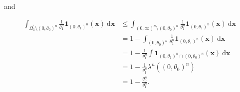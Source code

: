 \begin{solution}
\begin{enumerate}[label = (\alph*)]
    and

    \begin{align*}
        \int_{\Omega_1^\prime \setminus (0, \theta_0)^n}
            \frac{1}{\theta_1^n}
            \mathbf 1_{(0, \theta_1)^n}(\mathbf x)
            ~ \mathrm d \mathbf x
        & \leq
        \int_{(0, \infty)^n \setminus (0, \theta_0)^n}
            \frac{1}{\theta_1^n}
            \mathbf 1_{(0, \theta_1)^n}(\mathbf x)
            ~ \mathrm d \mathbf x \\
        & =
        1
        - 
        \int_{(0, \theta_0)^n}
            \frac{1}{\theta_1^n}
            \mathbf 1_{(0, \theta_1)^n}(\mathbf x)
            ~ \mathrm d \mathbf x \\
        & =
        1
        - 
        \frac{1}{\theta_1^n}
        \int
            \mathbf 1_{(0, \theta_1)^n \cap (0, \theta_0)^n}(\mathbf x)
            ~ \mathrm d \mathbf x \\
        & =
        1
        - 
        \frac{1}{\theta_1^n}
        \lambda^n((0, \theta_0)^n) \\
        & =
        1 - \frac{\theta_0^n}{\theta_1^n}.
    \end{align*}

\end{enumerate}

\end{solution}

